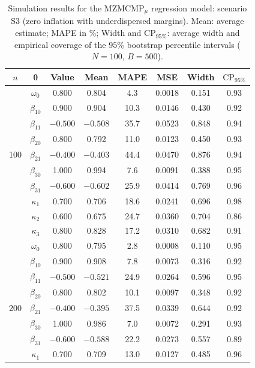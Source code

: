 \begin{table}[pos=htbp]
	\centering
	\caption{Simulation results for the $\mathrm{MZMCMP}_{\mu}$ regression model: scenario S3 (zero inflation with underdispersed margins). Mean: average estimate; MAPE in \%; Width and $\mathrm{CP}_{95\%}$: average width and empirical coverage of the $95\%$ bootstrap percentile intervals ($N=100$, $B=500$).}
	\label{tab:sim_S3}
	\begin{tabular}{@{}cccccccc@{}}
		\toprule
		$n$ & $\bm{\theta}$ & Value & Mean & MAPE & MSE & Width & $\mathrm{CP}_{95\%}$ \\
		\midrule
		 & $\omega_0$ & 0.800 & 0.804 & 4.3 & 0.0018 & 0.151 & 0.93 \\
		 & $\beta_{10}$ & 0.900 & 0.904 & 10.3 & 0.0146 & 0.430 & 0.92 \\
		 & $\beta_{11}$ & $-0.500$ & $-0.508$ & 35.7 & 0.0523 & 0.848 & 0.94 \\
		 & $\beta_{20}$ & 0.800 & 0.792 & 11.0 & 0.0123 & 0.450 & 0.93 \\
		100 & $\beta_{21}$ & $-0.400$ & $-0.403$ & 44.4 & 0.0470 & 0.876 & 0.94 \\
		 & $\beta_{30}$ & 1.000 & 0.994 & 7.6 & 0.0091 & 0.388 & 0.95 \\
		 & $\beta_{31}$ & $-0.600$ & $-0.602$ & 25.9 & 0.0414 & 0.769 & 0.96 \\
		 & $\kappa_1$ & 0.700 & 0.706 & 18.6 & 0.0241 & 0.696 & 0.98 \\
		 & $\kappa_2$ & 0.600 & 0.675 & 24.7 & 0.0360 & 0.704 & 0.86 \\
		 & $\kappa_3$ & 0.800 & 0.828 & 17.2 & 0.0310 & 0.682 & 0.91 \\
		\midrule
		 & $\omega_0$ & 0.800 & 0.795 & 2.8 & 0.0008 & 0.110 & 0.95 \\
		 & $\beta_{10}$ & 0.900 & 0.908 & 7.8 & 0.0073 & 0.316 & 0.92 \\
		 & $\beta_{11}$ & $-0.500$ & $-0.521$ & 24.9 & 0.0264 & 0.596 & 0.95 \\
		 & $\beta_{20}$ & 0.800 & 0.802 & 10.1 & 0.0097 & 0.348 & 0.92 \\
		200 & $\beta_{21}$ & $-0.400$ & $-0.395$ & 37.5 & 0.0339 & 0.644 & 0.92 \\
		 & $\beta_{30}$ & 1.000 & 0.986 & 7.0 & 0.0072 & 0.291 & 0.93 \\
		 & $\beta_{31}$ & $-0.600$ & $-0.588$ & 22.2 & 0.0273 & 0.557 & 0.89 \\
		 & $\kappa_1$ & 0.700 & 0.709 & 13.0 & 0.0127 & 0.485 & 0.96 \\

\end{tabular}
\end{table}
